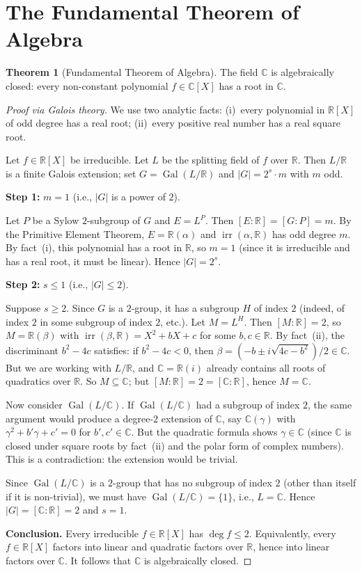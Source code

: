 \documentclass[12pt,a4paper,openany]{book}
\theoremstyle{definition}
\newtheorem{theorem}{Theorem}[chapter]
\theoremstyle{remark}
\newcommand{\R}{\mathbb{R}}
\newcommand{\C}{\mathbb{C}}
\DeclareMathOperator{\Gal}{Gal}
\renewcommand{\deg}{\operatorname{deg}}
\DeclareMathOperator{\irr}{irr}
\begin{document}
\section{The Fundamental Theorem of Algebra}
\label{sec:fta}

\begin{theorem}[Fundamental Theorem of Algebra]\label{thm:fta}
The field $\C$ is algebraically closed: every non-constant polynomial
$f\in\C[X]$ has a root in $\C$.
\end{theorem}

\begin{proof}[Proof via Galois theory]
We use two analytic facts: (i)~every polynomial in $\R[X]$ of odd degree has
a real root; (ii)~every positive real number has a real square root.

Let $f\in\R[X]$ be irreducible.  Let $L$ be the splitting field of $f$ over
$\R$.  Then $L/\R$ is a finite Galois extension; set $G=\Gal(L/\R)$
and $|G|=2^{s}\cdot m$ with $m$ odd.

\medskip\noindent
\textbf{Step 1:} $m=1$ (i.e., $|G|$ is a power of $2$).

Let $P$ be a Sylow $2$-subgroup of $G$ and $E=L^{P}$.  Then
$[E:\R]=[G:P]=m$.  By the Primitive Element Theorem, $E=\R(\alpha)$ and
$\irr(\alpha,\R)$ has odd degree $m$.  By fact~(i), this polynomial has a
root in $\R$, so $m=1$ (since it is irreducible and has a real root, it
must be linear).  Hence $|G|=2^{s}$.

\medskip\noindent
\textbf{Step 2:} $s\leq 1$ (i.e., $|G|\leq 2$).

Suppose $s\geq 2$.  Since $G$ is a $2$-group, it has a subgroup $H$ of
index $2$ (indeed, of index $2$ in some subgroup of index $2$, etc.).
Let $M=L^{H}$.  Then $[M:\R]=2$, so $M=\R(\beta)$ with
$\irr(\beta,\R)=X^{2}+bX+c$ for some $b,c\in\R$.  By fact~(ii), the
discriminant $b^{2}-4c$ satisfies: if $b^{2}-4c<0$, then
$\beta=(-b\pm i\sqrt{4c-b^{2}})/2\in\C$.  But we are working with
$L/\R$, and $\C=\R(i)$ already contains all roots of quadratics over $\R$.
So $M\subseteq\C$; but $[M:\R]=2=[\C:\R]$, hence $M=\C$.

Now consider $\Gal(L/\C)$.  If $\Gal(L/\C)$ had a subgroup of index $2$,
the same argument would produce a degree-$2$ extension of $\C$, say
$\C(\gamma)$ with $\gamma^{2}+b'\gamma+c'=0$ for $b',c'\in\C$.  But the
quadratic formula shows $\gamma\in\C$ (since $\C$ is closed under square
roots by fact~(ii) and the polar form of complex numbers).  This is a
contradiction: the extension would be trivial.

Since $\Gal(L/\C)$ is a $2$-group that has no subgroup of index $2$ (other
than itself if it is non-trivial), we must have $\Gal(L/\C)=\{1\}$, i.e.,
$L=\C$.  Hence $|G|=[\C:\R]=2$ and $s=1$.

\medskip\noindent
\textbf{Conclusion.}\;
Every irreducible $f\in\R[X]$ has $\deg f\leq 2$.  Equivalently, every
$f\in\R[X]$ factors into linear and quadratic factors over $\R$, hence
into linear factors over $\C$.  It follows that $\C$ is algebraically
closed.
\end{proof}
\end{document}
